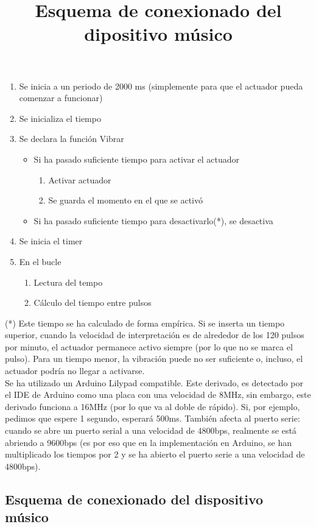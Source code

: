 \begin{enumerate}
  \item Se inicia a un periodo de 2000 ms (simplemente para que el actuador pueda comenzar a
  funcionar)
  \item Se inicializa el tiempo
  \item Se declara la función Vibrar
    \begin{itemize}
      \item Si ha pasado suficiente tiempo para activar el actuador
        \begin{enumerate}
          \item Activar actuador
          \item Se guarda el momento en el que se activó
        \end{enumerate}
      \item Si ha pasado suficiente tiempo para desactivarlo(*), se desactiva
    \end{itemize}
  \item Se inicia el timer
  \item En el bucle
    \begin{enumerate}
      \item Lectura del tempo
      \item Cálculo del tiempo entre pulsos
    \end{enumerate}
\end{enumerate}

(*) Este tiempo se ha calculado de forma empírica. Si se inserta un tiempo superior,
cuando la velocidad de interpretación es de alrededor de los 120 pulsos por minuto,
el actuador permanece activo siempre (por lo que no se marca el pulso). Para un tiempo
menor, la vibración puede no ser suficiente o, incluso, el actuador podría no llegar a
activarse.\\

Se ha utilizado un Arduino Lilypad compatible. Este derivado, es detectado por el IDE de Arduino
como una placa con una velocidad de 8MHz, sin embargo,
este derivado funciona a 16MHz (por lo que va al doble de rápido). Si, por ejemplo, pedimos que espere
1 segundo, esperará 500ms. También afecta al puerto serie: cuando se abre un puerto serial a una velocidad
de 4800bps, realmente se está abriendo a 9600bps (es por eso que en la implementación en Arduino, se han multiplicado
los tiempos por 2 y se ha abierto el puerto serie a una velocidad de 4800bps).\\

\subsection{Esquema de conexionado del dispositivo músico}
\title{Esquema de conexionado del dipositivo músico}


